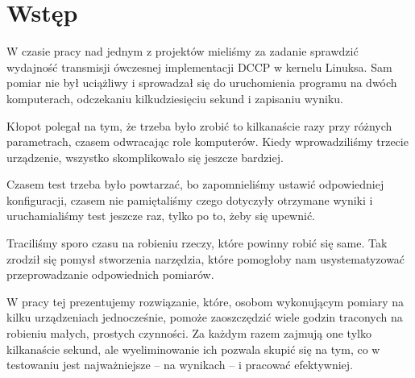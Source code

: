\documentclass[00-praca-magisterska.tex]{subfiles}
\begin{document}
\chapter{Wstęp}

W czasie pracy nad jednym z projektów mieliśmy za zadanie sprawdzić wydajność
transmisji ówczesnej implementacji DCCP w kernelu Linuksa. Sam pomiar nie był
uciążliwy i sprowadzał się do uruchomienia programu na dwóch komputerach,
odczekaniu kilkudziesięciu sekund i zapisaniu wyniku.

Kłopot polegał na tym, że trzeba było zrobić to kilkanaście razy przy różnych
parametrach, czasem odwracając role komputerów. Kiedy wprowadziliśmy trzecie
urządzenie, wszystko skomplikowało się jeszcze bardziej.

Czasem test trzeba było powtarzać, bo zapomnieliśmy ustawić odpowiedniej
konfiguracji, czasem nie pamiętaliśmy czego dotyczyły otrzymane wyniki i
uruchamialiśmy test jeszcze raz, tylko po to, żeby się upewnić.

Traciliśmy sporo czasu na robieniu rzeczy, które powinny robić się same. Tak
zrodził się pomysł stworzenia narzędzia, które pomogłoby nam usystematyzować
przeprowadzanie odpowiednich pomiarów.

W pracy tej prezentujemy rozwiązanie, które, osobom wykonującym pomiary na
kilku urządzeniach jednocześnie, pomoże zaoszczędzić wiele godzin traconych na
robieniu małych, prostych czynności. Za każdym razem zajmują one tylko
kilkanaście sekund, ale wyeliminowanie ich pozwala skupić się na tym, co w
testowaniu jest najważniejsze -- na wynikach -- i pracować efektywniej.
\end{document}

